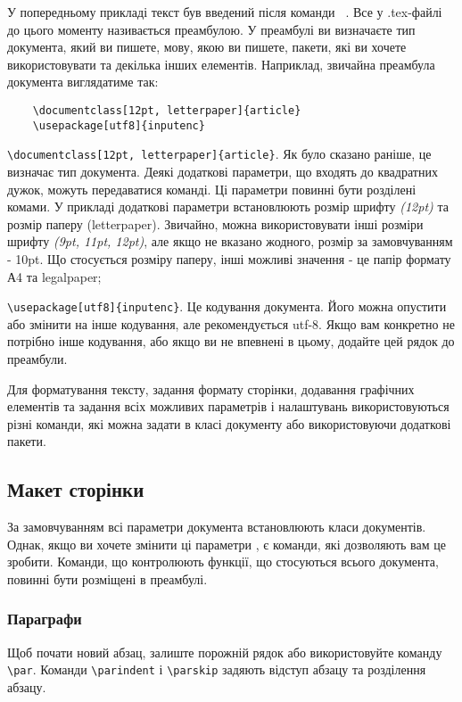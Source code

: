 У попередньому прикладі текст був введений після команди  \verb| |. Все у .tex-файлі до цього моменту називається преамбулою. У преамбулі ви визначаєте тип документа, який ви пишете, мову, якою ви пишете, пакети, які ви хочете використовувати та декілька інших елементів. Наприклад, звичайна преамбула документа виглядатиме так:

\begin{lstlisting}
	\documentclass[12pt, letterpaper]{article}
	\usepackage[utf8]{inputenc}
\end{lstlisting}

\verb|\documentclass[12pt, letterpaper]{article}|. Як було сказано раніше, це визначає тип документа. Деякі додаткові параметри, що входять до квадратних дужок, можуть передаватися команді. Ці параметри повинні бути розділені комами. У прикладі додаткові параметри встановлюють розмір шрифту \textit{(12pt)} та розмір паперу (letterpaper). Звичайно, можна використовувати інші розміри шрифту \textit{(9pt, 11pt, 12pt)}, але якщо не вказано жодного, розмір за замовчуванням - 10pt. Що стосується розміру паперу, інші можливі значення - це папір формату А4 та legalpaper; 

\verb|\usepackage[utf8]{inputenc}|. Це кодування документа. Його можна опустити або змінити на інше кодування, але рекомендується utf-8. Якщо вам конкретно не потрібно інше кодування, або якщо ви не впевнені в цьому, додайте цей рядок до преамбули.


Для форматування тексту, задання формату сторінки, додавання графічних елементів та задання всіх можливих параметрів і налаштувань використовуються різні команди, які можна задати в класі документу або використовуючи додаткові пакети. 

\subsection{Макет сторінки}

За замовчуванням всі параметри документа встановлюють класи документів. Однак,
якщо ви хочете змінити ці параметри , є команди, які дозволяють вам це зробити. Команди, що контролюють функції, що стосуються всього документа, повинні бути розміщені в преамбулі.

\subsubsection{Параграфи}\label{par}

Щоб почати новий абзац, залиште порожній рядок або використовуйте команду \verb|\par|. Команди \verb|\parindent| і \verb|\parskip| задяють відступ абзацу та розділення абзацу. 

